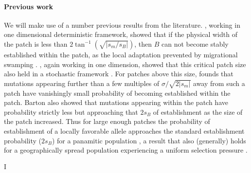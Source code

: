 \documentclass{article}
\begin{document}
\paragraph{Previous work} We will make use of a number previous
results from the literature. \citet{slatkin1973geneflow}, working in
one dimensional deterministic framework, showed that if the
physical width of the patch is less than $2 \tan^{-1}
(\sqrt{|s_m/s_B|})$, then $B$ can not 
become stably established within the patch, as the local adaptation prevented by
migrational swamping \citep[see also][ for a review]{Lenormand}.
 \citet{barton1987establishment}, again working in one dimension,
 showed that this critical patch size also held in a stochastic
 framework \citep[see also the work of][]{Polk}. 
For patches above this size, \citet{barton1987establishment}
 founds that mutations appearing further than a few multiples of
 $\sigma/\sqrt{2|s_m|}$ away from such a patch have vanishingly small
 probability of becoming established within the patch. 
Barton also showed that mutations appearing within the patch have probability 
strictly less but approaching that $2s_B$ of establishment as the size
of the patch increased. Thus for large enough patches the probability
of establishment of a locally favorable allele approaches the standard
establishment probability ($2s_B$) for a panamitic population
\citep[][]{haldane, fisher}, a result that also (generally) holds for
a geographically spread population experiencing a uniform selection
pressure \citep{Maruyama, cherry}. 




I%
\end{document}
